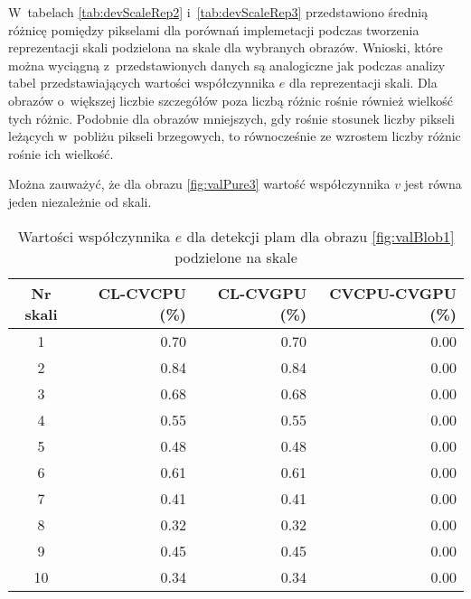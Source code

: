 W~tabelach \ref{tab:devScaleRep2} i~\ref{tab:devScaleRep3} przedstawiono średnią różnicę pomiędzy pikselami dla porównań implemetacji podczas tworzenia reprezentacji skali podzielona na skale dla wybranych obrazów. Wnioski, które można wyciągną z~przedstawionych danych są analogiczne jak podczas analizy tabel przedstawiających wartości współczynnika $ e $ dla reprezentacji skali. Dla obrazów o~większej liczbie szczegółów poza liczbą różnic rośnie również wielkość tych różnic. Podobnie dla obrazów mniejszych, gdy rośnie stosunek liczby pikseli leżących w~pobliżu pikseli brzegowych, to równocześnie ze wzrostem liczby różnic rośnie ich wielkość.

Można zauważyć, że dla obrazu \ref{fig:valPure3} wartość współczynnika $ v $ jest równa jeden niezależnie od skali.


\begin{center}
\begin{table}
\centering
\caption{Wartości współczynnika $ e $ dla detekcji plam dla obrazu \ref{fig:valBlob1} podzielone na skale}
\label{tab:imageScaleBlob1}
\begin{tabular}{|c|r|r|r|}
 \hline
Nr skali & CL-CVCPU (\%) & CL-CVGPU (\%) & CVCPU-CVGPU (\%) \\ \hline
1        & 0.70     & 0.70     & 0.00        \\ \hline
2        & 0.84     & 0.84     & 0.00       \\ \hline
3        & 0.68     & 0.68     & 0.00       \\ \hline
4        & 0.55     & 0.55     & 0.00        \\ \hline
5        & 0.48     & 0.48     & 0.00        \\ \hline
6        & 0.61     & 0.61     & 0.00        \\ \hline
7        & 0.41     & 0.41     & 0.00        \\ \hline
8        & 0.32     & 0.32     & 0.00        \\ \hline
9        & 0.45     & 0.45     & 0.00        \\ \hline
10       & 0.34     & 0.34     & 0.00        \\ \hline
\end{tabular}
\end{table}
\end{center}

